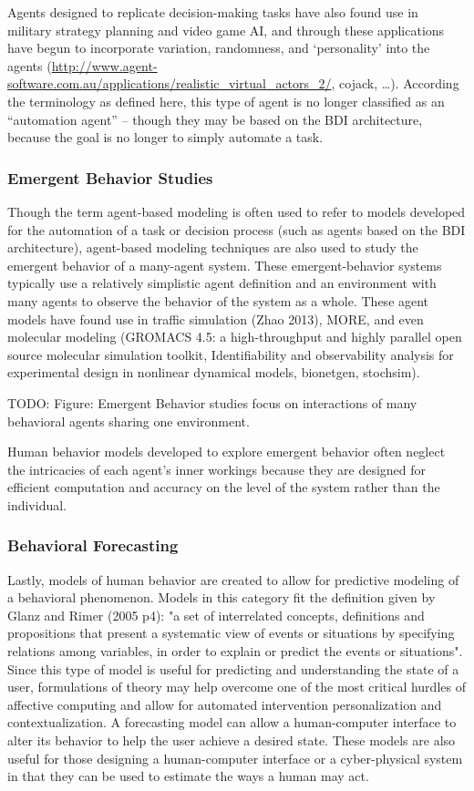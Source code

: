 Agents designed to replicate decision-making tasks have also found use in military strategy planning and video game AI, and through these applications have begun to incorporate variation, randomness, and ‘personality’ into the agents (\url{http://www.agent-software.com.au/applications/realistic_virtual_actors_2/}, cojack, …). 
According the terminology as defined here, this type of agent is no longer classified as an “automation agent” -- though they may be based on the BDI architecture, because the goal is no longer to simply automate a task.

\subsubsection{Emergent Behavior Studies}
Though the term agent-based modeling is often used to refer to models developed for the automation of a task or decision process (such as agents based on the BDI architecture), agent-based modeling techniques are also used to study the emergent behavior of a many-agent system. 
These emergent-behavior systems typically use a relatively simplistic agent definition and an environment with many agents to observe the behavior of the system as a whole. 
These agent models have found use in traffic simulation (Zhao 2013), MORE, and even molecular modeling (GROMACS 4.5: a high-throughput and highly parallel open source molecular simulation toolkit, Identifiability and observability analysis for experimental design in nonlinear dynamical models, bionetgen, stochsim).

TODO: Figure: Emergent Behavior studies focus on interactions of many behavioral agents sharing one environment.

Human behavior models developed to explore emergent behavior often neglect the intricacies of each agent’s inner workings because they are designed for efficient computation and accuracy on the level of the system rather than the individual. 

\subsubsection{Behavioral Forecasting}
Lastly, models of human behavior are created to allow for predictive modeling of a behavioral phenomenon.
Models in this category fit the definition given by Glanz and Rimer (2005 p4): "a set of interrelated concepts, definitions and propositions that present a systematic view of events or situations by specifying relations among variables, in order to explain or predict the events or situations".
Since this type of model is useful for predicting and understanding the state of a user, formulations of theory may help overcome one of the most critical hurdles of affective computing and allow for automated intervention personalization and contextualization. 
A forecasting model can allow a human-computer interface to alter its behavior to help the user achieve a desired state. 
These models are also useful for those designing a human-computer interface or a cyber-physical system in that they can be used to estimate the ways a human may act. 

